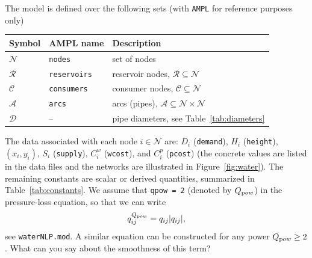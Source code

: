 \documentclass[11pt]{article}
\newcommand{\ampl}[1]{\texttt{#1}}
\begin{document}
The model is defined over the following sets (with {\tt AMPL} for reference purposes only)
\begin{center}
\begin{tabular}{ll@{\qquad}l}
  \toprule
  Symbol & AMPL name & Description \\
  \midrule
  $\mathcal{N}$ & \ampl{nodes}      & set of nodes \\
  $\mathcal{R}$ & \ampl{reservoirs} & reservoir nodes, $\mathcal{R}\subseteq\mathcal{N}$ \\
  $\mathcal{C}$ & \ampl{consumers}  & consumer nodes, $\mathcal{C}\subseteq\mathcal{N}$ \\
  $\mathcal{A}$ & \ampl{arcs}       & arcs (pipes), $\mathcal{A}\subseteq\mathcal{N}\times\mathcal{N}$ \\
  $\mathcal{D}$ & -- & pipe diameters, see Table~\ref{tab:diameters} \\
  \bottomrule
\end{tabular}
\end{center}

\newcommand{\Qpow}{Q_{\text pow}}
The data associated with each node $i\in\mathcal{N}$ are:
$D_i$ (\ampl{demand}), $H_i$ (\ampl{height}), $(x_i,y_i)$, $S_i$ (\ampl{supply}),
$C^{w}_i$ (\ampl{wcost}), and $C^{p}_i$ (\ampl{pcost}) (the concrete values are listed in the
data files and the networks are illustrated in Figure~\ref{fig:water}).
The remaining constants are scalar or derived quantities, summarized in
Table~\ref{tab:constants}. We assume that {\tt qpow = 2} (denoted by $\Qpow$) in the pressure-loss equation, so that we can write
\begin{equation}\label{eq:PL}
  q_{ij}^{\Qpow} = q_{ij} | q_{ij}|,
\end{equation}
see {\tt waterNLP.mod}. A similar equation can be constructed for any power $\Qpow\geq 2$. What can you say about the smoothness of this term?
\end{document}
